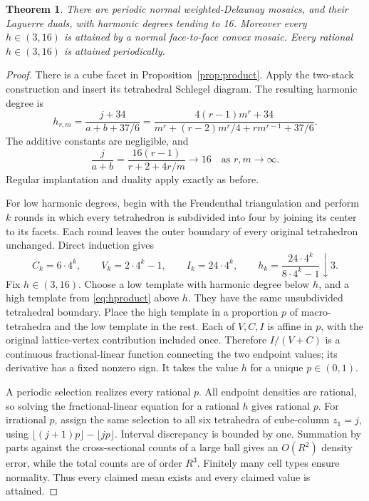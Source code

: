 \documentclass[11pt,a4paper]{article}
\newtheorem{theorem}{Theorem}[section]
\theoremstyle{definition}\newtheorem{definition}[theorem]{Definition}
\theoremstyle{remark}\newtheorem{remark}[theorem]{Remark}
\begin{document}
\begin{theorem}\label{thm:16}
There are periodic normal weighted-Delaunay mosaics, and their Laguerre duals, with harmonic degrees tending to 16. Moreover every \(h\in(3,16)\) is attained by a normal face-to-face convex mosaic. Every rational \(h\in(3,16)\) is attained periodically.
\end{theorem}
\begin{proof}
There is a cube facet in Proposition~\ref{prop:product}. Apply the two-stack construction and insert its tetrahedral Schlegel diagram. The resulting harmonic degree is
\begin{equation}\label{eq:hproduct}
 h_{r,m}=\frac{j+34}{a+b+37/6}
 =\frac{4(r-1)m^r+34}{m^r+(r-2)m^r/4+r m^{r-1}+37/6}.
\end{equation}
The additive constants are negligible, and
\[
 \frac{j}{a+b}=\frac{16(r-1)}{r+2+4r/m}\longrightarrow16
 \quad\text{as }r,m\longrightarrow\infty.
\]
Regular implantation and duality apply exactly as before.

For low harmonic degrees, begin with the Freudenthal triangulation and perform \(k\) rounds in which every tetrahedron is subdivided into four by joining its center to its facets. Each round leaves the outer boundary of every original tetrahedron unchanged. Direct induction gives
\[
 C_k=6\cdot4^k,\qquad V_k=2\cdot4^k-1,\qquad I_k=24\cdot4^k,
 \qquad h_k=\frac{24\cdot4^k}{8\cdot4^k-1}\downarrow3.
\]
Fix \(h\in(3,16)\). Choose a low template with harmonic degree below \(h\), and a high template from \eqref{eq:hproduct} above \(h\). They have the same unsubdivided tetrahedral boundary. Place the high template in a proportion \(p\) of macro-tetrahedra and the low template in the rest. Each of \(V,C,I\) is affine in \(p\), with the original lattice-vertex contribution included once. Therefore \(I/(V+C)\) is a continuous fractional-linear function connecting the two endpoint values; its derivative has a fixed nonzero sign. It takes the value \(h\) for a unique \(p\in(0,1)\).

A periodic selection realizes every rational \(p\). All endpoint densities are rational, so solving the fractional-linear equation for a rational \(h\) gives rational \(p\). For irrational \(p\), assign the same selection to all six tetrahedra of cube-column \(z_1=j\), using \(\lfloor(j+1)p\rfloor-\lfloor jp\rfloor\). Interval discrepancy is bounded by one. Summation by parts against the cross-sectional counts of a large ball gives an \(O(R^2)\) density error, while the total counts are of order \(R^3\). Finitely many cell types ensure normality. Thus every claimed mean exists and every claimed value is attained.
\end{proof}
\end{document}
